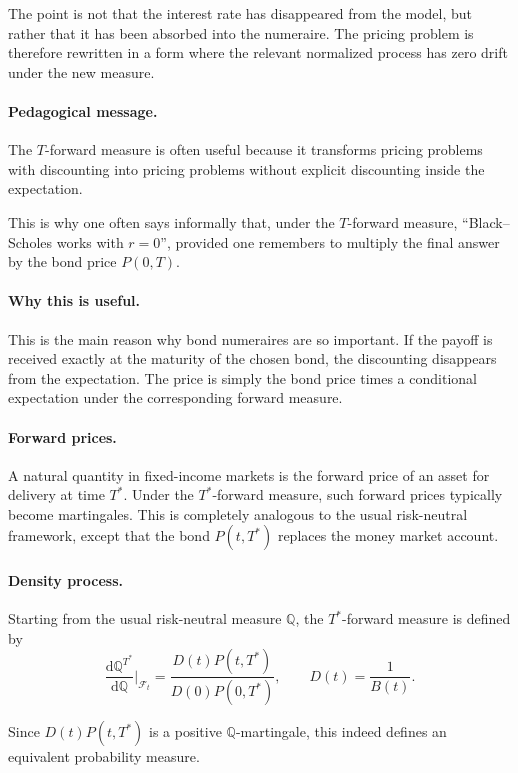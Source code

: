 \documentclass[11pt]{article}
\newcommand{\Qbb}{\mathbb{Q}}
\theoremstyle{definition}
\theoremstyle{plain}
\begin{document}
The point is not that the interest rate has disappeared from the model,
but rather that it has been absorbed into the numeraire.
The pricing problem is therefore rewritten in a form where the relevant
normalized process has zero drift under the new measure.

\paragraph{Pedagogical message.}

The \(T\)-forward measure is often useful because it transforms pricing
problems with discounting into pricing problems without explicit
discounting inside the expectation.

This is why one often says informally that, under the \(T\)-forward
measure, ``Black--Scholes works with \(r=0\)'', provided one remembers to
multiply the final answer by the bond price \(P(0,T)\).


\paragraph{Why this is useful.}
This is the main reason why bond numeraires are so important.
If the payoff is received exactly at the maturity of the chosen bond,
the discounting disappears from the expectation.
The price is simply the bond price times a conditional expectation under
the corresponding forward measure.

\paragraph{Forward prices.}
A natural quantity in fixed-income markets is the forward price of an
asset for delivery at time \(T^\ast\).
Under the \(T^\ast\)-forward measure, such forward prices typically
become martingales.
This is completely analogous to the usual risk-neutral framework, except
that the bond \(P(t,T^\ast)\) replaces the money market account.

\paragraph{Density process.}
Starting from the usual risk-neutral measure \(\Qbb\), the
\(T^\ast\)-forward measure is defined by
\[
\frac{\mathrm{d}\Qbb^{T^\ast}}{\mathrm{d}\Qbb}\Big|_{\mathcal{F}_t}
=
\frac{D(t)P(t,T^\ast)}{D(0)P(0,T^\ast)},
\qquad D(t)=\frac1{B(t)}.
\]

Since \(D(t)P(t,T^\ast)\) is a positive \(\Qbb\)-martingale, this indeed
defines an equivalent probability measure.
\end{document}
